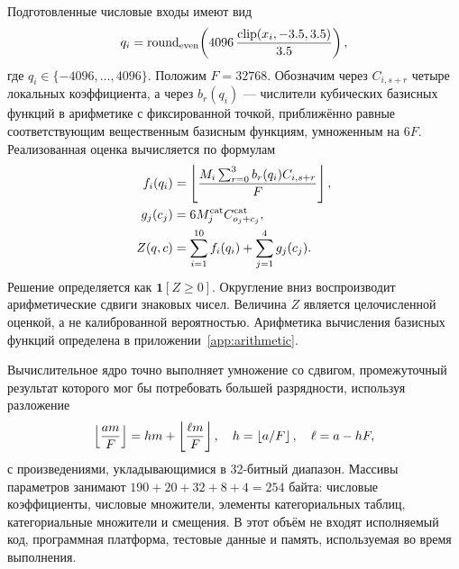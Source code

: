 Подготовленные числовые входы имеют вид
\begin{equation}
q_i=\operatorname{round}_{\rm even}\!\left(4096\,\frac{\operatorname{clip}(x_i,-3.5,3.5)}{3.5}\right),
\end{equation}
где $q_i\in\{-4096,\ldots,4096\}$. Положим $F=32768$. Обозначим через $C_{i,s+r}$ четыре локальных коэффициента, а через $b_r(q_i)$ --- числители кубических базисных функций в арифметике с фиксированной точкой, приближённо равные соответствующим вещественным базисным функциям, умноженным на $6F$. Реализованная оценка вычисляется по формулам
\begin{align}
f_i(q_i)&=\left\lfloor \frac{M_i\sum_{r=0}^{3}b_r(q_i)C_{i,s+r}}{F}\right\rfloor,\\
g_j(c_j)&=6M^{\rm cat}_j C^{\rm cat}_{o_j+c_j},\\
Z(q,c)&=\sum_{i=1}^{10}f_i(q_i)+\sum_{j=1}^{4}g_j(c_j).
\label{eq:integer}
\end{align}
Решение определяется как $\mathbf1[Z\geq0]$. Округление вниз воспроизводит арифметические сдвиги знаковых чисел. Величина $Z$ является целочисленной оценкой, а не калиброванной вероятностью. Арифметика вычисления базисных функций определена в приложении~\ref{app:arithmetic}.

Вычислительное ядро точно выполняет умножение со сдвигом, промежуточный результат которого мог бы потребовать большей разрядности, используя разложение
\begin{equation}
\left\lfloor \frac{am}{F}\right\rfloor=hm+\left\lfloor \frac{\ell m}{F}\right\rfloor,\quad
h=\left\lfloor a/F\right\rfloor,\quad \ell=a-hF,
\end{equation}
с произведениями, укладывающимися в 32-битный диапазон. Массивы параметров занимают $190+20+32+8+4=254$ байта: числовые коэффициенты, числовые множители, элементы категориальных таблиц, категориальные множители и смещения. В этот объём не входят исполняемый код, программная платформа, тестовые данные и память, используемая во время выполнения.


